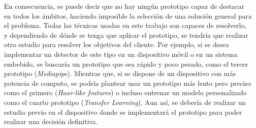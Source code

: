 En consecuencia, se puede decir que no hay ningún prototipo capaz de destacar en todos los ámbitos, haciendo imposible la selección de una solución general para el problema. Todas las técnicas usadas en este trabajo son capaces de resolverlo, y dependiendo de dónde se tenga que aplicar el prototipo, se tendría que realizar otro estudio para resolver los objetivos del cliente. Por ejemplo,  si se desea implementar un detector de este tipo en un dispositivo móvil o en un sistema embebido, se buscaría un prototipo que sea rápido y poco pesado, como el tercer prototipo (\textit{Mediapipe}). Mientras que, si se dispone de un dispositivo con más potencia de computo, se podría plantear usar un prototipo más lento pero preciso como el primero (\textit{Haar-like features}) o incluso entrenar un modelo personalizado como el cuarto prototipo (\textit{Transfer Learning}). Aun así, se debería de realizar un estudio previo en el dispositivo donde se implementará el prototipo para poder realizar una decisión definitiva.  



